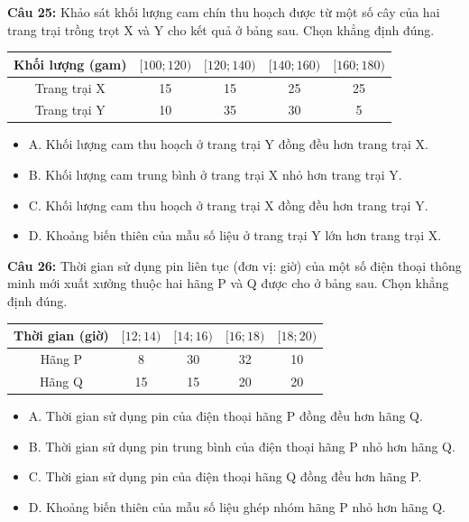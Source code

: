 \documentclass[12pt]{article}
\begin{document}
	\vspace{4mm}
	
	\noindent \textbf{Câu 25:} Khảo sát khối lượng cam chín thu hoạch được từ một số cây của hai trang trại trồng trọt X và Y cho kết quả ở bảng sau. Chọn khẳng định đúng.
	\begin{center}
		\renewcommand{\arraystretch}{1.3}
		\begin{tabular}{|c|c|c|c|c|}
			\hline
			Khối lượng (gam) & $[100; 120)$ & $[120; 140)$ & $[140; 160)$ & $[160; 180)$ \\
			\hline
			Trang trại X & 15 & 15 & 25 & 25 \\
			\hline
			Trang trại Y & 10 & 35 & 30 & 5 \\
			\hline
		\end{tabular}
	\end{center}
	\begin{itemize}[label=, leftmargin=*]
		\item A. Khối lượng cam thu hoạch ở trang trại Y đồng đều hơn trang trại X.
		\item B. Khối lượng cam trung bình ở trang trại X nhỏ hơn trang trại Y.
		\item C. Khối lượng cam thu hoạch ở trang trại X đồng đều hơn trang trại Y.
		\item D. Khoảng biến thiên của mẫu số liệu ở trang trại Y lớn hơn trang trại X.
	\end{itemize}
	
	\vspace{4mm}
	
	\noindent \textbf{Câu 26:} Thời gian sử dụng pin liên tục (đơn vị: giờ) của một số điện thoại thông minh mới xuất xưởng thuộc hai hãng P và Q được cho ở bảng sau. Chọn khẳng định đúng.
	\begin{center}
		\renewcommand{\arraystretch}{1.3}
		\begin{tabular}{|c|c|c|c|c|}
			\hline
			Thời gian (giờ) & $[12; 14)$ & $[14; 16)$ & $[16; 18)$ & $[18; 20)$ \\
			\hline
			Hãng P & 8 & 30 & 32 & 10 \\
			\hline
			Hãng Q & 15 & 15 & 20 & 20 \\
			\hline
		\end{tabular}
	\end{center}
	\begin{itemize}[label=, leftmargin=*]
		\item A. Thời gian sử dụng pin của điện thoại hãng P đồng đều hơn hãng Q.
		\item B. Thời gian sử dụng pin trung bình của điện thoại hãng P nhỏ hơn hãng Q.
		\item C. Thời gian sử dụng pin của điện thoại hãng Q đồng đều hơn hãng P.
		\item D. Khoảng biến thiên của mẫu số liệu ghép nhóm hãng P nhỏ hơn hãng Q.
	\end{itemize}
	
\end{document}
